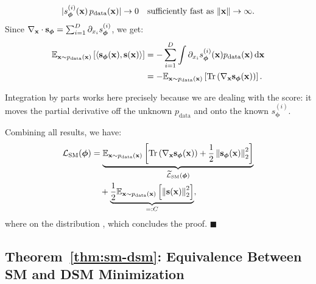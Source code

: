         \[
        |s_{\bm{\phi}}^{(i)}({\mathbf{x}})\, p_{\text{data}}({\mathbf{x}})| \to 0 \quad \text{sufficiently fast as } \|{\mathbf{x}}\| \to \infty .
        \]
        Since $\nabla_{{\mathbf{x}}}\cdot{\mathbf{s}}_{\bm{\phi}} = \sum_{i=1}^D \partial_{x_i} s_{\bm{\phi}}^{(i)}$, we get:
        \begin{align*}
            \mathbb{E}_{{\mathbf{x}} \sim p_{\text{data}}({\mathbf{x}})} \left[ \langle {\mathbf{s}}_{\bm{\phi}}({\mathbf{x}}), {\mathbf{s}}({\mathbf{x}}) \rangle \right] 
             &= - \sum_{i=1}^{D} \int  \partial_{x_i}s_{\bm{\phi}}^{(i)}({\mathbf{x}}) p_{\text{data}}({\mathbf{x}}) \mathop{}\!\mathrm{d} {\mathbf{x}} \\
             &= - \mathbb{E}_{{\mathbf{x}} \sim p_{\text{data}}({\mathbf{x}})} \left[\operatorname{Tr}\left(\nabla_{{\mathbf{x}}}{\mathbf{s}}_{\bm{\phi}}({\mathbf{x}})\right) \right].
        \end{align*}
        \begin{nknote}
        Integration by parts works here precisely because we are dealing with the score: it moves the partial derivative off the unknown $p_{\text{data}}$ and onto the known $s_{\bm{\phi}}^{(i)}$.
        \end{nknote}
        Combining all results, we have:
        \begin{align*}
        \mathcal{L}_{\text{SM}}(\bm{\phi}) &= \underbrace{\mathbb{E}_{{\mathbf{x}} \sim p_{\text{data}}({\mathbf{x}})} \left[\operatorname{Tr}\left(\nabla_{{\mathbf{x}}}{\mathbf{s}}_{\bm{\phi}}({\mathbf{x}})\right) + \frac{1}{2}  \left\lVert{\mathbf{s}}_{\bm{\phi}}({\mathbf{x}})\right\rVert_2^2 \right]}_{\widetilde{\mathcal{L}}_{\text{SM}}(\bm{\phi})} \\
        &\quad + \underbrace{\frac{1}{2}\mathbb{E}_{{\mathbf{x}} \sim p_{\text{data}}({\mathbf{x}})} \left[ \left\lVert{\mathbf{s}}({\mathbf{x}})\right\rVert_2^2 \right]}_{=:C},
        \end{align*}
        where  on the distribution , which concludes the proof.
\hfill$\blacksquare$

\subsection{Theorem~\ref{thm:sm-dsm}: Equivalence Between SM and DSM Minimization}\label{app-sec:sm-dsm}
